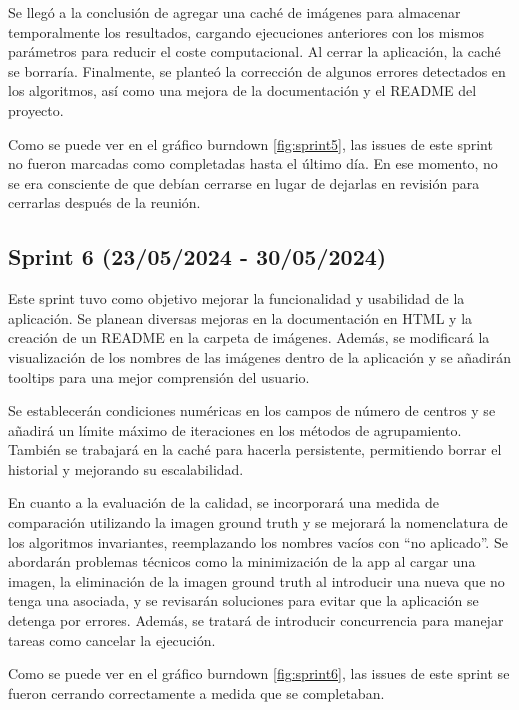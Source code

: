 Se llegó a la conclusión de agregar una caché de imágenes para almacenar temporalmente los resultados, cargando ejecuciones anteriores con los mismos parámetros para reducir el coste computacional. Al cerrar la aplicación, la caché se borraría. Finalmente, se planteó la corrección de algunos errores detectados en los algoritmos, así como una mejora de la documentación y el README del proyecto.


Como se puede ver en el gráfico burndown \ref{fig:sprint5}, las issues de este sprint no fueron marcadas como completadas hasta el último día. En ese momento, no se era consciente de que debían cerrarse en lugar de dejarlas en revisión para cerrarlas después de la reunión.


\subsection{Sprint 6 (23/05/2024 - 30/05/2024)}\label{sprint-6}

Este sprint tuvo como objetivo mejorar la funcionalidad y usabilidad de la aplicación. Se planean diversas mejoras en la documentación en HTML y la creación de un README en la carpeta de imágenes. Además, se modificará la visualización de los nombres de las imágenes dentro de la aplicación y se añadirán tooltips para una mejor comprensión del usuario.

Se establecerán condiciones numéricas en los campos de número de centros y se añadirá un límite máximo de iteraciones en los métodos de agrupamiento. También se trabajará en la caché para hacerla persistente, permitiendo borrar el historial y mejorando su escalabilidad.

En cuanto a la evaluación de la calidad, se incorporará una medida de comparación utilizando la imagen ground truth y se mejorará la nomenclatura de los algoritmos invariantes, reemplazando los nombres vacíos con “no aplicado”. Se abordarán problemas técnicos como la minimización de la app al cargar una imagen, la eliminación de la imagen ground truth al introducir una nueva que no tenga una asociada, y se revisarán soluciones para evitar que la aplicación se detenga por errores. Además, se tratará de introducir concurrencia para manejar tareas como cancelar la ejecución.


Como se puede ver en el gráfico burndown \ref{fig:sprint6}, las issues de este sprint se fueron cerrando correctamente a medida que se completaban.


